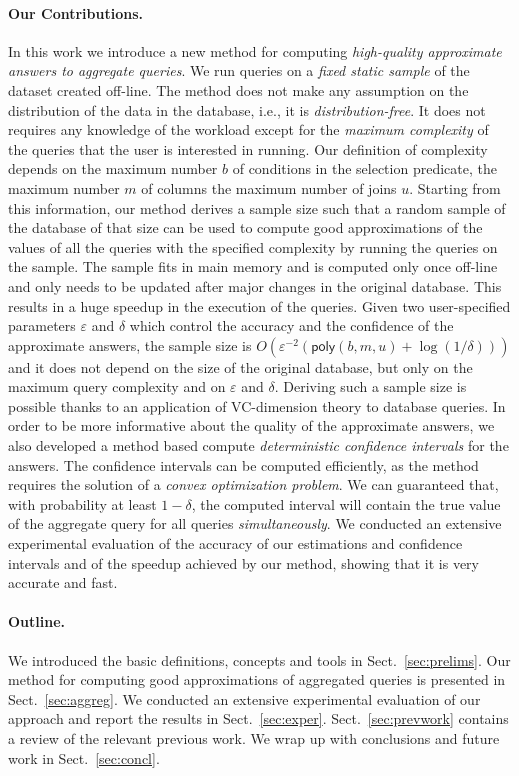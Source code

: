 \paragraph{Our Contributions.} In this work we introduce a new method for
computing \emph{high-quality approximate answers to aggregate queries}. We run
queries on a \emph{fixed static sample} of the dataset created off-line. The
method does not make any assumption on the distribution of the data in the
database, i.e., it is \emph{distribution-free}. It does not requires any
knowledge of the workload except for the
\emph{maximum complexity} of the queries that the user is interested in running. Our
definition of complexity depends on the maximum number $b$ of conditions in
the selection predicate, the maximum number $m$ of columns the maximum number of
joins $u$. Starting from this information, our method derives a sample size
such that a random sample of the database of that size can be used to compute good
approximations of the values of all the queries with the specified complexity by
running the queries on the sample. The sample fits in main memory and is computed only once off-line and only
needs to be updated after major changes in the original database. This results
in a huge speedup in the execution of the queries. Given two user-specified
parameters $\varepsilon$ and $\delta$ which control the
accuracy and the confidence of the approximate answers, the sample size is
$O(\varepsilon^{-2}(\mathsf{poly}(b,m,u)+\log(1/\delta)))$ and it does not depend
on the size of the original database, but only on the maximum query complexity
and on $\varepsilon$ and $\delta$. Deriving such a sample size is possible thanks to an
application of VC-dimension theory to database queries. In order to be more
informative about the quality of the approximate answers, we also developed a
method based compute \emph{deterministic confidence intervals} for the answers.
The confidence intervals can be computed efficiently, as the method requires the
solution of a \emph{convex optimization problem}. We can guaranteed that, with
probability at least $1-\delta$, the computed interval will contain the true
value of the aggregate query for all queries \emph{simultaneously}. We conducted
an extensive experimental evaluation of the accuracy of our estimations and
confidence intervals and of the speedup achieved by our method, showing that it
is very accurate and fast.

\paragraph{Outline.} We introduced the basic definitions, concepts and tools in
Sect.~\ref{sec:prelims}. Our method for computing good approximations of
aggregated queries is presented in Sect.~\ref{sec:aggreg}. We conducted an
extensive experimental evaluation of our approach and report the results in
Sect.~\ref{sec:exper}. Sect.~\ref{sec:prevwork} contains a review of the
relevant previous work.  We wrap up with conclusions and future work in
Sect.~\ref{sec:concl}.

